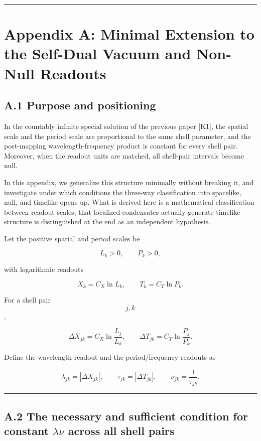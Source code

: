 \documentclass[
  a4paper,
]{article}
\begin{document}
\begin{center}\rule{0.5\linewidth}{0.5pt}\end{center}

\section{Appendix A: Minimal Extension to the Self-Dual Vacuum and
Non-Null
Readouts}\label{appendix-a-minimal-extension-to-the-self-dual-vacuum-and-non-null-readouts}

\subsection{A.1 Purpose and
positioning}\label{a.1-purpose-and-positioning}

In the countably infinite special solution of the previous paper
{[}K1{]}, the spatial scale and the period scale are proportional to the
same shell parameter, and the post-mapping wavelength-frequency product
is constant for every shell pair. Moreover, when the readout units are
matched, all shell-pair intervals become null.

In this appendix, we generalize this structure minimally without
breaking it, and investigate under which conditions the three-way
classification into spacelike, null, and timelike opens up. What is
derived here is a mathematical classification between readout scales;
that localized condensates actually generate timelike structure is
distinguished at the end as an independent hypothesis.

Let the positive spatial and period scales be

\[
L_k>0,
\qquad
P_k>0,
\]

with logarithmic readouts

\[
X_k=C_X\ln L_k,
\qquad
T_k=C_T\ln P_k.
\tag{A1}
\]

For a shell pair \[j,k\],

\[
\Delta X_{jk}
=
C_X\ln\frac{L_j}{L_k},
\qquad
\Delta T_{jk}
=
C_T\ln\frac{P_j}{P_k}.
\tag{A2}
\]

Define the wavelength readout and the period/frequency readouts as

\[
\lambda_{jk}=|\Delta X_{jk}|,
\qquad
\tau_{jk}=|\Delta T_{jk}|,
\qquad
\nu_{jk}=\frac{1}{\tau_{jk}}.
\tag{A3}
\]

\begin{center}\rule{0.5\linewidth}{0.5pt}\end{center}

\subsection{\texorpdfstring{A.2 The necessary and sufficient condition
for constant \(\lambda\nu\) across all shell
pairs}{A.2 The necessary and sufficient condition for constant \textbackslash lambda\textbackslash nu across all shell pairs}}\label{a.2-the-necessary-and-sufficient-condition-for-constant-lambdanu-across-all-shell-pairs}
\end{document}
